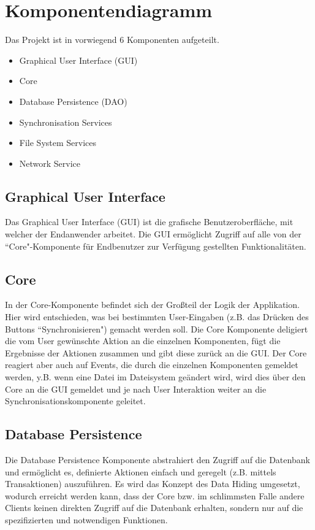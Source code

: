 \section{Komponentendiagramm}


Das Projekt ist in vorwiegend 6 Komponenten aufgeteilt. 
\begin{itemize}
	\item Graphical User Interface (GUI)
	\item Core
	\item Database Persistence (DAO)
	\item Synchronisation Services
	\item File System Services
	\item Network Service
\end{itemize}

\subsection{Graphical User Interface}
Das Graphical User Interface (GUI) ist die grafische Benutzeroberfläche, mit welcher der Endanwender arbeitet.
Die GUI ermöglicht Zugriff auf alle von der ``Core"-Komponente für Endbenutzer zur Verfügung gestellten
Funktionalitäten.

\subsection{Core}
In der Core-Komponente befindet sich der Großteil der Logik der Applikation. Hier wird entschieden, was bei
bestimmten User-Eingaben (z.B. das Drücken des Buttons ``Synchronisieren") gemacht werden soll. Die
Core Komponente deligiert die vom User gewünschte Aktion an die einzelnen Komponenten, fügt die Ergebnisse
der Aktionen zusammen und gibt diese zurück an die GUI. Der Core reagiert aber auch auf Events, die durch
die einzelnen Komponenten gemeldet werden, y.B. wenn eine Datei im Dateisystem geändert wird, wird dies über
den Core an die GUI gemeldet und je nach User Interaktion weiter an die Synchronisationskomponente geleitet.

\subsection{Database Persistence}
Die Database Persistence Komponente abstrahiert den Zugriff auf die Datenbank und ermöglicht es, definierte
Aktionen einfach und geregelt (z.B. mittels Transaktionen) auszuführen. Es wird das Konzept des Data Hiding
umgesetzt, wodurch erreicht werden kann, dass der Core bzw. im schlimmsten Falle andere Clients keinen direkten
Zugriff auf die Datenbank erhalten, sondern nur auf die spezifizierten und notwendigen Funktionen. 

